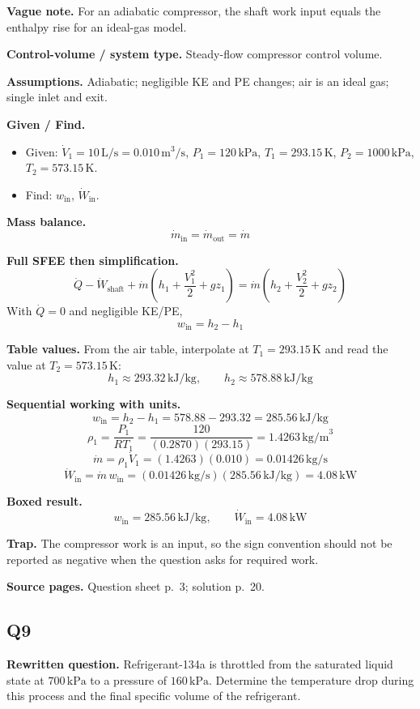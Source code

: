 \textbf{Vague note.} For an adiabatic compressor, the shaft work input equals the enthalpy rise for an ideal-gas model.

\textbf{Control-volume / system type.} Steady-flow compressor control volume.

\textbf{Assumptions.} Adiabatic; negligible KE and PE changes; air is an ideal gas; single inlet and exit.

\textbf{Given / Find.}
\begin{itemize}
  \item Given: $\dot V_1=10\,\text{L/s}=0.010\,\text{m}^3/\text{s}$, $P_1=120\,\text{kPa}$, $T_1=293.15\,\text{K}$, $P_2=1000\,\text{kPa}$, $T_2=573.15\,\text{K}$.
  \item Find: $w_{\text{in}}$, $\dot W_{\text{in}}$.
\end{itemize}

\textbf{Mass balance.}
\[
\dot m_{\text{in}}=\dot m_{\text{out}}=\dot m
\]

\textbf{Full SFEE then simplification.}
\[
\dot Q-\dot W_{\text{shaft}}+\dot m\left(h_1+\frac{V_1^2}{2}+gz_1\right)
=\dot m\left(h_2+\frac{V_2^2}{2}+gz_2\right)
\]
With $\dot Q=0$ and negligible KE/PE,
\[
 w_{\text{in}} = h_2-h_1
\]

\textbf{Table values.} From the air table, interpolate at $T_1=293.15\,\text{K}$ and read the value at $T_2=573.15\,\text{K}$:
\[
 h_1 \approx 293.32\,\text{kJ/kg}, \qquad h_2 \approx 578.88\,\text{kJ/kg}
\]

\textbf{Sequential working with units.}
\[
 w_{\text{in}} = h_2-h_1 = 578.88-293.32 = 285.56\,\text{kJ/kg}
\]
\[
\rho_1=\frac{P_1}{RT_1}=\frac{120}{(0.2870)(293.15)}=1.4263\,\text{kg/m}^3
\]
\[
\dot m = \rho_1\dot V_1=(1.4263)(0.010)=0.01426\,\text{kg/s}
\]
\[
\dot W_{\text{in}} = \dot m\,w_{\text{in}} = (0.01426\,\text{kg/s})(285.56\,\text{kJ/kg}) = 4.08\,\text{kW}
\]

\textbf{Boxed result.}
\[
\boxed{w_{\text{in}} = 285.56\,\text{kJ/kg}, \qquad \dot W_{\text{in}} = 4.08\,\text{kW}}
\]

\textbf{Trap.} The compressor work is an input, so the sign convention should not be reported as negative when the question asks for required work.

\textbf{Source pages.} Question sheet p.~3; solution p.~20.

\subsection*{Q9}
\textbf{Rewritten question.} Refrigerant-134a is throttled from the saturated liquid state at $700\,\text{kPa}$ to a pressure of $160\,\text{kPa}$. Determine the temperature drop during this process and the final specific volume of the refrigerant.

